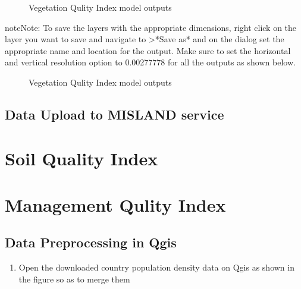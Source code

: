 \documentclass[letterpaper,10pt,english]{sphinxmanual}
\let\sphinxpxdimen\pdfpxdimen\else\newdimen\sphinxpxdimen
\begin{document}
\begin{figure}[H]
\centering
\capstart

\noindent\sphinxincludegraphics[width=800\sphinxpxdimen,height=450\sphinxpxdimen]{{vqi5}.png}
\caption{Vegetation Qulity Index model outputs}\label{\detokenize{Preprocessing/vqi:id7}}\end{figure}

\begin{sphinxadmonition}{note}{Note:}
\sphinxAtStartPar
To save the layers with the appropriate dimensions, right click on the layer you want to save and navigate to \textgreater{}*Save as* and on the  dialog set the appropriate name and location for the output. Make sure to set the horizontal and vertical resolution option to 0.00277778 for all the outputs as shown below.
\end{sphinxadmonition}

\begin{figure}[H]
\centering
\capstart

\noindent\sphinxincludegraphics[width=839\sphinxpxdimen,height=657\sphinxpxdimen]{{vqi6}.png}
\caption{Vegetation Qulity Index model outputs}\label{\detokenize{Preprocessing/vqi:id8}}\end{figure}


\section{Data Upload to MISLAND service}
\label{\detokenize{Preprocessing/vqi:data-upload-to-misland-service}}
\sphinxstepscope


\chapter{Soil Quality Index}
\label{\detokenize{Preprocessing/sqi:soil-quality-index}}\label{\detokenize{Preprocessing/sqi::doc}}
\sphinxstepscope


\chapter{Management Qulity Index}
\label{\detokenize{Preprocessing/mqi:management-qulity-index}}\label{\detokenize{Preprocessing/mqi::doc}}

\section{Data Preprocessing in Qgis}
\label{\detokenize{Preprocessing/mqi:data-preprocessing-in-qgis}}\begin{enumerate}
%
\item {} 
\sphinxAtStartPar
Open the downloaded country population density data on Qgis as shown in the figure so as to merge them

\end{enumerate}
\end{document}
